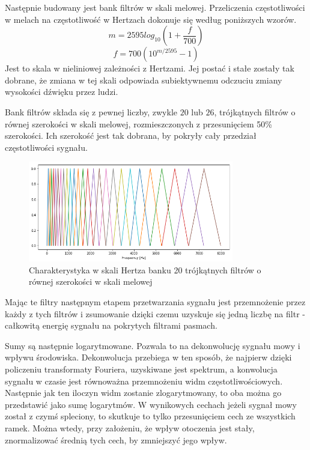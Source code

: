 Następnie budowany jest bank filtrów w skali melowej. Przeliczenia częstotliwości w melach na
częstotliwość w Hertzach dokonuje się według poniższych wzorów.
$$m = 2595 log_{10}(1 + \frac{f}{700})$$
$$f = 700 (10^{m/2595} - 1)$$
Jest to skala w nieliniowej zależności z Hertzami. Jej postać i stałe zostały tak dobrane,
że zmiana w tej skali odpowiada subiektywnemu odczuciu zmiany wysokości dźwięku przez ludzi.

Bank filtrów składa się z pewnej liczby, zwykle $20$ lub $26$, trójkątnych filtrów o równej
szerokości w skali melowej, rozmieszczonych z przesunięciem 50\% szerokości. Ich szerokość
jest tak dobrana, by pokryły cały przedział częstotliwości sygnału.

\begin{figure}[H]
    \centering
    \includegraphics[width=0.8\textwidth]{images/2_1_d_mel_filters}
    \caption{Charakterystyka w skali Hertza banku 20 trójkątnych filtrów o równej szerokości w skali melowej}
    \label{fig:2_1_d_mel_filters}
\end{figure}

Mając te filtry następnym etapem przetwarzania sygnału jest przemnożenie przez każdy z tych filtrów i zsumowanie
dzięki czemu uzyskuje się jedną liczbę na filtr - całkowitą energię sygnału na pokrytych filtrami pasmach.

Sumy są następnie logarytmowane. Pozwala to na dekonwolucję sygnału mowy i wpływu środowiska.
Dekonwolucja przebiega w ten sposób, że najpierw dzięki policzeniu transformaty Fouriera,
uzyskiwane jest spektrum, a konwolucja sygnału w czasie jest równoważna przemnożeniu widm częstotliwościowych.
Następnie jak ten iloczyn widm zostanie zlogarytmowany, to oba można go przedstawić jako sumę logarytmów.
W wynikowych cechach jeżeli sygnał mowy został z czymś spleciony, to skutkuje to tylko przesunięciem cech
ze wszystkich ramek. Można wtedy, przy założeniu, że wpływ otoczenia jest stały, znormalizować średnią tych cech,
by zmniejszyć jego wpływ.

